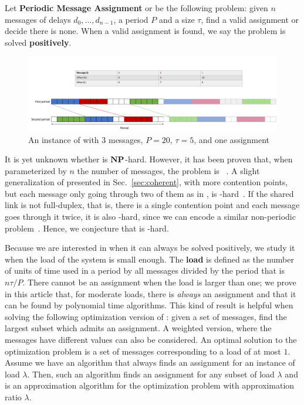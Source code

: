 \documentclass[pdflatex,sn-mathphys,iicol]{sn-jnl}%
\theoremstyle{thmstyleone}%
\theoremstyle{thmstyletwo}%
\theoremstyle{thmstylethree}%
\begin{document}
Let \textbf{Periodic Message Assignment} or \pma be the following problem: given $n$ messages of delays $d_0,\dots,d_{n-1}$, a period $P$ and a size $\tau$, find a valid assignment or decide there is none. When a valid assignment is found, we say the problem is solved \textbf{positively}.

\begin{figure}
\begin{center}
\includegraphics[scale=0.3]{instance2.pdf}
\end{center}
\caption{An instance of \pma with $3$ messages, $P= 20$, $\tau = 5$, and one assignment}
\label{fig:assignment}
\end{figure}

It is yet unknown whether \pma is $\textbf{NP}$-hard. However, it has been proven that, when parameterized by $n$ the number of messages, the problem is \FPT~\cite{barth2018deterministic}. A slight generalization of \pma presented in Sec.~\ref{sec:coherent}, with more contention points, but each message only going through two of them as in \pma, is \NP-hard~\cite{barth2018deterministic}. If the shared link is not full-duplex, that is, there is a single contention point and each message goes through it twice, it is also \NP-hard, since we can encode a similar non-periodic problem~\cite{orman1997complexity}. Hence, we conjecture that \pma is \NP-hard.
	
Because we are interested in \pma when it can always be solved positively, we study it when the load of the system is small enough. The \textbf{load} is defined as the number of units of time used in a period by all messages divided by the period that is $n\tau /P$. There cannot be an assignment when the load is larger than one; we prove in this article that, for moderate loads, there is \emph{always} an assignment and that it can be found by polynomial time algorithms. This kind of result is helpful when solving the following optimization version of \pma: given a set of messages, find the largest subset which admits an assignment. A weighted version, where the messages have different values can also be considered. An optimal solution to the optimization problem is a set of messages corresponding to a load of at most $1$. Assume we have an algorithm that always finds an assignment for an instance of load $\lambda$. Then, such an algorithm finds an assignment for any subset of load $\lambda$ and is an approximation algorithm for the optimization problem with approximation ratio $\lambda$.
\end{document}
